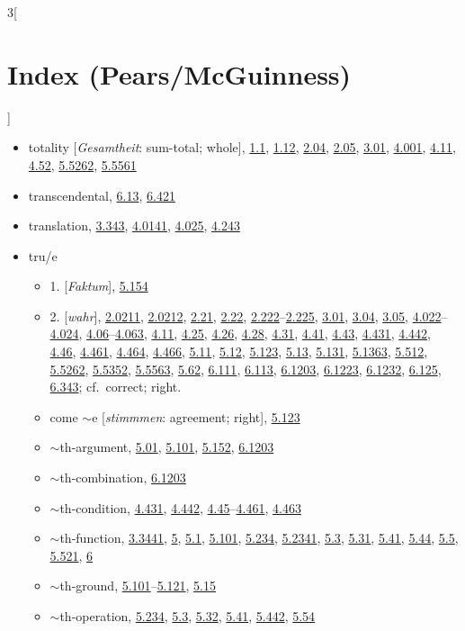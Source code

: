 \documentclass[oneside,openany,12pt]{book}
\newcommand{\indexentry}[1]{\item #1}
\newcommand{\indexsubentry}[1]{\begin{itemize} \item #1 \end{itemize}}
\newcommand{\indexref}[1]{\hyperlink{prop#1}{#1}}
\begin{document}
\begin{multicols}{3}[\section*{Index (Pears/McGuinness)}]
\begin{itemize}
\indexentry{totality [\textit{Gesamtheit}: sum-total; whole], \indexref{1.1}, \indexref{1.12}, \indexref{2.04}, \indexref{2.05}, \indexref{3.01}, \indexref{4.001}, \indexref{4.11}, \indexref{4.52}, \indexref{5.5262}, \indexref{5.5561}}

\indexentry{transcendental, \indexref{6.13}, \indexref{6.421}}

\indexentry{translation, \indexref{3.343}, \indexref{4.0141}, \indexref{4.025}, \indexref{4.243}}

\indexentry{tru/e}

   \indexsubentry{1. [\textit{Faktum}], \indexref{5.154}}

   \indexsubentry{2. [\textit{wahr}], \indexref{2.0211}, \indexref{2.0212}, \indexref{2.21}, \indexref{2.22}, \indexref{2.222}--\indexref{2.225}, \indexref{3.01}, \indexref{3.04}, \indexref{3.05}, \indexref{4.022}--\indexref{4.024}, \indexref{4.06}--\indexref{4.063}, \indexref{4.11}, \indexref{4.25}, \indexref{4.26}, \indexref{4.28}, \indexref{4.31}, \indexref{4.41}, \indexref{4.43}, \indexref{4.431}, \indexref{4.442}, \indexref{4.46}, \indexref{4.461}, \indexref{4.464}, \indexref{4.466}, \indexref{5.11}, \indexref{5.12}, \indexref{5.123}, \indexref{5.13}, \indexref{5.131}, \indexref{5.1363}, \indexref{5.512}, \indexref{5.5262}, \indexref{5.5352}, \indexref{5.5563}, \indexref{5.62}, \indexref{6.111}, \indexref{6.113}, \indexref{6.1203}, \indexref{6.1223}, \indexref{6.1232}, \indexref{6.125}, \indexref{6.343}; cf.\ correct; right.}

   \indexsubentry{come $\sim$e [\textit{stimmmen}: agreement; right], \indexref{5.123}}

   \indexsubentry{$\sim$th-argument, \indexref{5.01}, \indexref{5.101}, \indexref{5.152}, \indexref{6.1203}}

   \indexsubentry{$\sim$th-combination, \indexref{6.1203}}

   \indexsubentry{$\sim$th-condition, \indexref{4.431}, \indexref{4.442}, \indexref{4.45}--\indexref{4.461}, \indexref{4.463}}

   \indexsubentry{$\sim$th-function, \indexref{3.3441}, \indexref{5}, \indexref{5.1}, \indexref{5.101}, \indexref{5.234}, \indexref{5.2341}, \indexref{5.3}, \indexref{5.31}, \indexref{5.41}, \indexref{5.44}, \indexref{5.5}, \indexref{5.521}, \indexref{6}}

   \indexsubentry{$\sim$th-ground, \indexref{5.101}--\indexref{5.121}, \indexref{5.15}}

   \indexsubentry{$\sim$th-operation, \indexref{5.234}, \indexref{5.3}, \indexref{5.32}, \indexref{5.41}, \indexref{5.442}, \indexref{5.54}}


\end{itemize}
\end{multicols}
\end{document}
